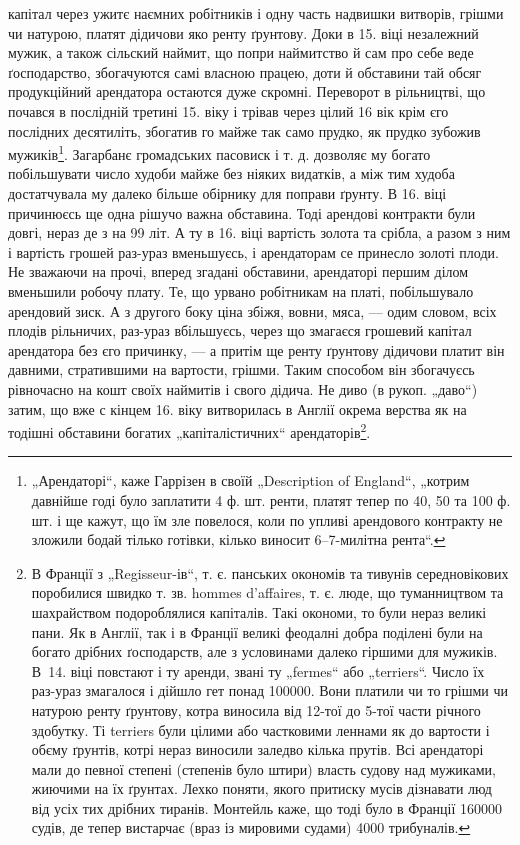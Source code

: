 \parcont{}
капітал через ужитє наємних робітників і одну часть надвишки витворів, грішми чи натурою, платят
дідичови яко ренту ґрунтову. Доки в 15. віці незалежний мужик, а також сільский наймит, що попри
наймитство й сам про себе веде ґосподарство, збогачуются самі власною працею, доти й обставини тай
обсяг продукційний арендатора остаются дуже скромні. Переворот в рільництві, що почався в послідній
третині 15. віку і трівав через цілий 16 вік крім єго послідних десятиліть, збогатив го майже так
само прудко, як прудко зубожив мужиків\footnote{
„Арендаторі“, каже Гаррізен в своїй „Description of England“, „котрим давнійше годі було
заплатити 4 ф. шт. ренти, платят тепер по 40, 50 та 100 ф. шт. і ще кажут, що їм зле повелося, коли
по упливі арендового контракту не зложили бодай тілько готівки, кілько виносит 6--7-милітна рента“.
}. Загарбанє громадських пасовиск і т. д. дозволяє му
богато побільшувати число худоби майже без ніяких видатків, а між тим худоба достатчувала му далеко
більше обірнику для поправи ґрунту. В 16. віці причинюєсь ще одна рішучо важна обставина. Тоді
арендові контракти були довгі, нераз де з на 99 літ. А ту в 16. віці вартість золота та срібла, а
разом з ним і вартість грошей раз-ураз вменьшуєсь, і арендаторам се принесло золоті плоди. Не
зважаючи на прочі, вперед згадані обставини, арендаторі першим ділом вменьшили робочу плату. Те, що
урвано робітникам на платі, побільшувало
арендовий зиск. А з другого боку ціна збіжя, вовни, мяса, — одим словом, всіх плодів рільничих,
раз-ураз вбільшуєсь, через що змагаєся грошевий капітал арендатора
без єго причинку, — а притім ще ренту ґрунтову дідичови платит він давними, стратившими на вартости,
грішми. Таким способом він збогачуєсь рівночасно на кошт своїх наймитів і свого дідича. Не диво (в
рукоп. „даво“) затим, що вже с кінцем 16. віку витворилась в Англії окрема верства як на тодішні
обставини богатих „капіталістичних“ арендаторів\footnote{
В Франції з „Regisseur-ів“, т. є. панських окономів та тивунів середновікових поробилися швидко
т. зв. hommes d'affaires, т. є. люде, що туманництвом та шахрайством подороблялися капіталів. Такі
окономи, то були нераз великі пани. Як в Англії, так і в Франції великі феодалні добра поділені були
на богато дрібних ґосподарств, але з условинами далеко гіршими для мужиків. В~14. віці повстают і ту
аренди, звані ту „fermes“ або „terriers“. Число їх раз-ураз змагалося і дійшло гет понад
100000. Вони платили чи то грішми чи натурою ренту ґрунтову, котра виносила від 12-тої до 5-тої
части річного здобутку. Ті terriers були цілими або частковими леннами як до вартости і обєму
ґрунтів, котрі нераз виносили заледво кілька прутів. Всі арендаторі мали до певної степені (степенів
було штири) власть судову над мужиками, жиючими
на їх ґрунтах. Лехко поняти, якого притиску мусів дізнавати люд від
усіх тих дрібних тиранів. Монтейль каже, що тоді було в Франції 160000
судів, де тепер вистарчає (враз із мировими судами) 4000 трибуналів.
}.
